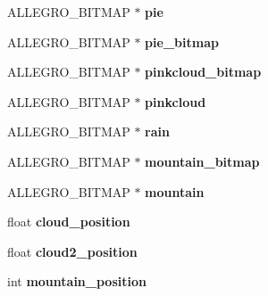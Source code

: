 \begin{DoxyCompactItemize}
\item 
\hypertarget{structMenu_aecb8d4bc36372688287b88bc72bc7fc5}{\-A\-L\-L\-E\-G\-R\-O\-\_\-\-B\-I\-T\-M\-A\-P $\ast$ {\bfseries pie}}\label{structMenu_aecb8d4bc36372688287b88bc72bc7fc5}

\item 
\hypertarget{structMenu_a83bf3e989a2f1c8548b96ea09331216b}{\-A\-L\-L\-E\-G\-R\-O\-\_\-\-B\-I\-T\-M\-A\-P $\ast$ {\bfseries pie\-\_\-bitmap}}\label{structMenu_a83bf3e989a2f1c8548b96ea09331216b}

\item 
\hypertarget{structMenu_a970ef9c492ae797fc59d22fa6cfead71}{\-A\-L\-L\-E\-G\-R\-O\-\_\-\-B\-I\-T\-M\-A\-P $\ast$ {\bfseries pinkcloud\-\_\-bitmap}}\label{structMenu_a970ef9c492ae797fc59d22fa6cfead71}

\item 
\hypertarget{structMenu_aed7cb93aa725e86457bacc8c571613fb}{\-A\-L\-L\-E\-G\-R\-O\-\_\-\-B\-I\-T\-M\-A\-P $\ast$ {\bfseries pinkcloud}}\label{structMenu_aed7cb93aa725e86457bacc8c571613fb}

\item 
\hypertarget{structMenu_a32636926b40bf5b4f58f282af2cfd968}{\-A\-L\-L\-E\-G\-R\-O\-\_\-\-B\-I\-T\-M\-A\-P $\ast$ {\bfseries rain}}\label{structMenu_a32636926b40bf5b4f58f282af2cfd968}

\item 
\hypertarget{structMenu_a115b21e5dcfdcf1393e3b5d3b041a7b7}{\-A\-L\-L\-E\-G\-R\-O\-\_\-\-B\-I\-T\-M\-A\-P $\ast$ {\bfseries mountain\-\_\-bitmap}}\label{structMenu_a115b21e5dcfdcf1393e3b5d3b041a7b7}

\item 
\hypertarget{structMenu_a51f93f4e7421fc2d88704d6926b8e144}{\-A\-L\-L\-E\-G\-R\-O\-\_\-\-B\-I\-T\-M\-A\-P $\ast$ {\bfseries mountain}}\label{structMenu_a51f93f4e7421fc2d88704d6926b8e144}

\item 
\hypertarget{structMenu_a0e6c60743147ff2ead1e0bb2f89d0036}{float {\bfseries cloud\-\_\-position}}\label{structMenu_a0e6c60743147ff2ead1e0bb2f89d0036}

\item 
\hypertarget{structMenu_a143c3675204c7cf1381decbfe4be5476}{float {\bfseries cloud2\-\_\-position}}\label{structMenu_a143c3675204c7cf1381decbfe4be5476}

\item 
\hypertarget{structMenu_a10770a9453a92c77d64c7fdb0e34e725}{int {\bfseries mountain\-\_\-position}}\label{structMenu_a10770a9453a92c77d64c7fdb0e34e725}


\end{DoxyCompactItemize}
